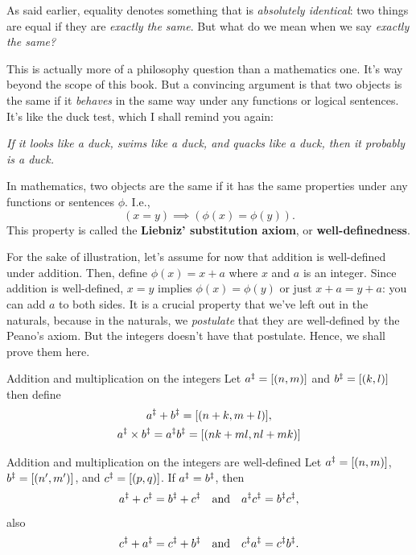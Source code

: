 As said earlier, equality denotes something that is \emph{absolutely identical}: two things are
equal if they are \emph{exactly the same}. But what do we mean when we say \emph{exactly the same?}

This is actually more of a philosophy question than a mathematics one. It's way beyond the scope of
this book. But a convincing argument is that two objects is the same if it \emph{behaves} in the
same way under any functions or logical sentences. It's like the duck test, which I shall remind you
again:
\begin{displayquote}
  \emph{If it looks like a duck, swims like a duck, and quacks like a duck, then it probably is a
  duck.}
\end{displayquote}

In mathematics, two objects are the same if it has the same properties under any
functions or sentences \(\phi\). I.e.,
\begin{equation}
  (x = y) \implies (\phi(x) = \phi(y)).
\end{equation}
This property is called the \textbf{Liebniz' substitution axiom}, or \textbf{well-definedness}.

For the sake of illustration, let's assume for now that addition is well-defined under
addition. Then, define \(\phi(x) = x + a\) where \(x\) and \(a\) is an integer. Since
addition is well-defined, \(x = y\) implies \(\phi(x) = \phi(y)\) or just \(x + a = y + a\):
you can add \(a\) to both sides. It is a crucial property that we've left out in the
naturals, because in the naturals, we \emph{postulate} that they are well-defined by
the Peano's axiom. But the integers doesn't have that postulate. Hence, we shall prove them here.

\begin{df}{Addition and multiplication on the integers}{}
  Let \(a^{\ddagger} = [(n, m)]\) and \(b^{\ddagger} = [(k, l)]\) then define
  \begin{gather}
    a^{\ddagger} + b^{\ddagger} = [(n + k, m + l)],                            \\
    a^{\ddagger} \times b^{\ddagger} = a^{\ddagger}b^{\ddagger} = [(nk + ml, nl + mk)]
  \end{gather}
\end{df}

\begin{prop}{Addition and multiplication on the integers are well-defined}{}
  Let \(a^{\ddagger} = [(n, m)]\), \(b^{\ddagger} = [(n', m')]\), and \(c^{\ddagger} = [(p, q)]\). If
  \(a^{\ddagger} = b^{\ddagger}\), then
  \begin{equation}
    a^{\ddagger} + c^{\ddagger} = b^{\ddagger} + c^{\ddagger} \quad\textrm{and}\quad a^{\ddagger}c^{\ddagger} = b^{\ddagger}c^{\ddagger},
  \end{equation}
  also
  \begin{equation}
    c^{\ddagger} + a^{\ddagger} = c^{\ddagger} + b^{\ddagger} \quad\textrm{and}\quad c^{\ddagger}a^{\ddagger} = c^{\ddagger}b^{\ddagger}.
  \end{equation}
\end{prop}

